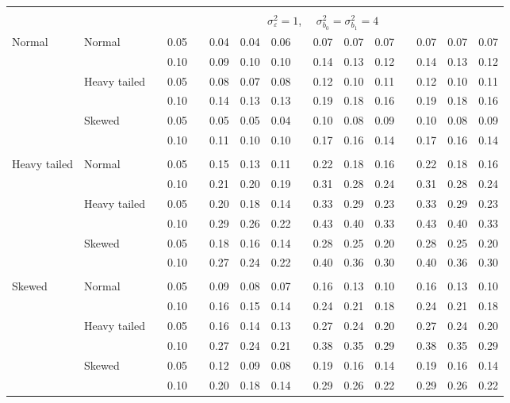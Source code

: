 \documentclass[11pt]{article} %
\begin{document}
\begin{table}[ht]
\begin{scriptsize}
\begin{center}
\begin{tabular}{ll p{.1cm} c p{.1cm} rrr p{.1cm} rrr p{.1cm} rrr}
&&&&&&&&&&&&&&&\\
& && && \multicolumn{9}{c}{$\sigma_{\varepsilon}^2 = 1$, \ \ $\sigma_{b_0}^2 = \sigma_{b_1}^2 = 4$} \\ \cline{6-16}
Normal       & Normal       && 0.05 &&   0.04 & 0.04 & 0.06 && 0.07 & 0.07 & 0.07 && 0.07 & 0.07 & 0.07 \\ 
             &              && 0.10 &&   0.09 & 0.10 & 0.10 && 0.14 & 0.13 & 0.12 && 0.14 & 0.13 & 0.12 \\ 
             & Heavy tailed && 0.05 &&   0.08 & 0.07 & 0.08 && 0.12 & 0.10 & 0.11 && 0.12 & 0.10 & 0.11 \\ 
             &              && 0.10 &&   0.14 & 0.13 & 0.13 && 0.19 & 0.18 & 0.16 && 0.19 & 0.18 & 0.16 \\ 
             & Skewed       && 0.05 &&   0.05 & 0.05 & 0.04 && 0.10 & 0.08 & 0.09 && 0.10 & 0.08 & 0.09 \\ 
             &              && 0.10 &&   0.11 & 0.10 & 0.10 && 0.17 & 0.16 & 0.14 && 0.17 & 0.16 & 0.14 \\ 
             &&&&&&&&&&&&&&&\\
Heavy tailed & Normal       && 0.05 &&   0.15 & 0.13 & 0.11 && 0.22 & 0.18 & 0.16 && 0.22 & 0.18 & 0.16 \\ 
             &              && 0.10 &&   0.21 & 0.20 & 0.19 && 0.31 & 0.28 & 0.24 && 0.31 & 0.28 & 0.24 \\ 
             & Heavy tailed && 0.05 &&   0.20 & 0.18 & 0.14 && 0.33 & 0.29 & 0.23 && 0.33 & 0.29 & 0.23 \\ 
             &              && 0.10 &&   0.29 & 0.26 & 0.22 && 0.43 & 0.40 & 0.33 && 0.43 & 0.40 & 0.33 \\ 
             & Skewed       && 0.05 &&   0.18 & 0.16 & 0.14 && 0.28 & 0.25 & 0.20 && 0.28 & 0.25 & 0.20 \\ 
             &              && 0.10 &&   0.27 & 0.24 & 0.22 && 0.40 & 0.36 & 0.30 && 0.40 & 0.36 & 0.30 \\
             &&&&&&&&&&&&&&&\\ 
Skewed       & Normal       && 0.05 &&   0.09 & 0.08 & 0.07 && 0.16 & 0.13 & 0.10 && 0.16 & 0.13 & 0.10 \\ 
             &              && 0.10 &&   0.16 & 0.15 & 0.14 && 0.24 & 0.21 & 0.18 && 0.24 & 0.21 & 0.18 \\ 
             & Heavy tailed && 0.05 &&   0.16 & 0.14 & 0.13 && 0.27 & 0.24 & 0.20 && 0.27 & 0.24 & 0.20 \\ 
             &              && 0.10 &&   0.27 & 0.24 & 0.21 && 0.38 & 0.35 & 0.29 && 0.38 & 0.35 & 0.29 \\ 
             & Skewed       && 0.05 &&   0.12 & 0.09 & 0.08 && 0.19 & 0.16 & 0.14 && 0.19 & 0.16 & 0.14 \\ 
             &              && 0.10 &&   0.20 & 0.18 & 0.14 && 0.29 & 0.26 & 0.22 && 0.29 & 0.26 & 0.22 \\ 



\end{tabular}
\end{center}
\end{scriptsize}
\end{table}
\end{document}
